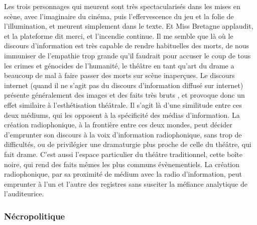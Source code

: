 \documentclass[
]{article}
\begin{document}
Les trois personnages qui meurent sont très spectacularisés dans les mises en scène, avec l'imaginaire du cinéma, puis l'effervescence du jeu et la folie de l'illumination, et meurent simplement dans le texte. Et Miss Bretagne applaudit, et la plateforme dit merci, et l'incendie continue. Il me semble que là où le discours d'information est très capable de rendre habituelles des morts, de nous immuniser de l'empathie trop grande qu'il faudrait pour accuser le coup de tous les crimes et génocides de l'humanité, le théâtre en tant qu'art du drame a beaucoup de mal à faire passer des morts sur scène inaperçues. Le discours internet (quand il ne s'agit pas du discours d'information diffusé sur internet) présente généralement des images et des faits très bruts , et provoque donc un effet similaire à l'esthétisation théâtrale. Il s'agit là d'une similitude entre ces deux médiums, qui les opposent à la spécificité des médias d'information. La création radiophonique, à la frontière entre ces deux mondes, peut décider d'emprunter son discours à la voix d'information radiophonique, sans trop de difficultés, ou de privilégier une dramaturgie plus proche de celle du théâtre, qui fait drame. C'est aussi l'espace particulier du théâtre traditionnel, cette boîte noire, qui rend des faits mêmes les plus communs évènementiels. La création radiophonique, par sa proximité de médium avec la radio d'information, peut emprunter à l'un et l'autre des registres sans susciter la méfiance analytique de l'auditeurice.

\subsubsection{Nécropolitique}\label{nuxe9cropolitique}
\end{document}

